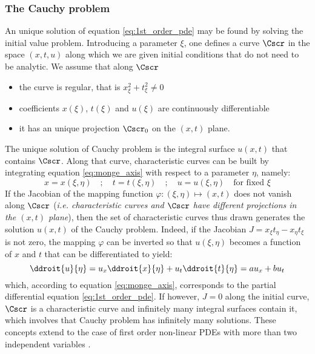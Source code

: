\subsubsection*{The Cauchy problem}
An unique solution of equation \ref{eq:1st_order_pde} may be found by solving the initial value problem. Introducing a parameter $\xi$, one defines a curve $\Cscr$ in the space $(x,t,u)$ along which we are given initial conditions that do not need to be analytic. We assume that along $\Cscr$
\begin{itemize}
\item the curve is regular, that is $x_\xi^2 + t_\xi^2 \neq 0$
\item coefficients $x(\xi)$, $t(\xi)$ and $u(\xi)$ are continuously differentiable
\item it has an unique projection $\Cscr_0$ on the $(x,t)$ plane.
\end{itemize}
The unique solution of Cauchy problem is the integral surface $u(x,t)$ that contains $\Cscr$.
Along that curve, characteristic curves can be built by integrating equation \ref{eq:monge_axis} with respect to a parameter $\eta$, namely:
\begin{equation}
  \label{eq:charac_on_C}
  x=x(\xi,\eta) \quad ; \quad t=t(\xi,\eta) \quad ; \quad u=u(\xi,\eta) \quad \text{for fixed } \xi
\end{equation}
If the Jacobian of the mapping function $\varphi:(\xi,\eta) \mapsto (x,t)$ does not vanish along $\Cscr$ (\textit{i.e. characteristic curves and $\Cscr$ have different projections in the $(x,t)$ plane}), then the set of characteristic curves thus drawn generates the solution $u(x,t)$ of the Cauchy problem. Indeed, if the Jacobian $J=x_\xi t_\eta - x_\eta t_\xi$ is not zero, the mapping $\varphi$ can be inverted so that $u(\xi,\eta)$ becomes a function of $x$ and $t$ that can be differentiated to yield:
\begin{equation*}
  \ddroit{u}{\eta}= u_x \ddroit{x}{\eta} + u_t \ddroit{t}{\eta} =  a u_x + b u_t
\end{equation*}
which, according to equation \ref{eq:monge_axis}, corresponds to the partial differential equation \ref{eq:1st_order_pde}. If however, $J=0$ along the initial curve, $\Cscr$ is a characteristic curve and infinitely many integral surfaces contain it, which involves that Cauchy problem has infinitely many solutions. These concepts extend to the case of first order non-linear PDEs with more than two independent variables \cite[Chapter~2]{Courant}.

